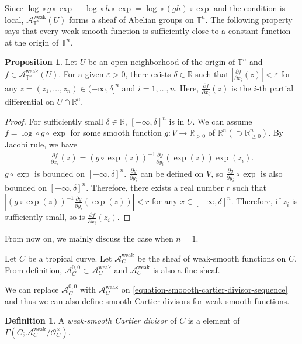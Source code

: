 \documentclass[a4paper,dvipdfmx,reqno,12pt]{amsart}
\theoremstyle{definition}
\newtheorem{definition}[theorem]{Definition}
\newtheorem{proposition}[theorem]{Proposition}
\newcommand{\vep}{\varepsilon}%
\newcommand{\opn}[1]{\operatorname{#1}}
\numberwithin{equation}{section}
\begin{document}
Since $\opn{log}\circ g\circ\opn{exp}+\opn{log}\circ h
\circ \opn{exp}=\opn{log}\circ(gh)\circ\opn{exp}$ and 
the condition is local, 
$\mathcal{A}_{\mathbb{T}^{n}}^{\opn{weak}}(U)$ forms a 
sheaf of Abelian groups on $\mathbb{T}^{n}$. 
The following property says that every weak-smooth 
function is sufficiently close to a constant function 
at the origin of $\mathbb{T}^{n}$.
\begin{proposition}
Let $U$ be an open neighborhood of the origin of 
$\mathbb{T}^{n}$ and 
 $f\in \mathcal{A}_{\mathbb{T}^{n}}^{\mathrm{weak}}(U)$.
For a given $\vep >0$, there exists $\delta\in \mathbb{R}$
such that $|\frac{\partial f}{\partial x_i}(z)|<\vep$
for any $z=(z_1,\ldots,z_n) \in (-\infty,\delta]^{n}$ and $i=1,\ldots,n$. 
Here, $\frac{\partial f}{\partial x_i}(z)$ is the $i$-th partial 
differential on $U\cap \mathbb{R}^{n}$.
\end{proposition}
\begin{proof}
For sufficiently small $\delta\in \mathbb{R}$, 
$[-\infty,\delta]^{n}$ is in $U$. 
We can assume $f=\opn{log}\circ g\circ \opn{exp}$ for
some smooth function 
$g\colon V\to \mathbb{R}_{>0}$ of $\mathbb{R}^{n} 
(\supset \mathbb{R}_{\geq 0}^{n})$.
By Jacobi rule, we have
\begin{align}
\frac{\partial f}{\partial x_i}(z)=(g\circ \opn{exp}(z))^{-1} 
\frac{\partial g}{\partial y_i}(\opn{exp}(z))\opn{exp}(z_i).
\end{align}
$g\circ \opn{exp}$ is bounded on $[-\infty,\delta]^{n}$.
$\frac{\partial g}{\partial y_i}$ can be defined 
on $V$, so $\frac{\partial g}{\partial y_i}\circ \opn{exp}$
is also bounded on $[-\infty,\delta]^{n}$.
Therefore, there exists a real number $r$ such that
$|(g\circ \opn{exp}(z))^{-1} 
\frac{\partial g}{\partial y_i}(\opn{exp}(z))|<r$ for any 
$x\in [-\infty,\delta]^{n}$.
Therefore, if $z_i$ is sufficiently small, so is 
$\frac{\partial f}{\partial x_i}(z_i)$. 
\end{proof}
From now on, we mainly discuss the case when $n=1$.

Let $C$ be a tropical curve. 
Let $\mathcal{A}_C^{\opn{weak}}$ be the sheaf 
of weak-smooth functions on $C$. From definition,
$\mathcal{A}_C^{0,0}\subset \mathcal{A}_C^{\opn{weak}}$
and $\mathcal{A}_C^{\opn{weak}}$ is also a fine sheaf.

We can replace $\mathcal{A}_C^{0,0}$ with 
$\mathcal{A}_C^{\opn{weak}}$
on \cref{equation-smoooth-cartier-divisor-sequence}
and thus we can also define smooth Cartier divisors
for weak-smooth functions. 
\begin{definition}
A \emph{weak-smooth Cartier divisor} of $C$ is a 
element of $\Gamma(C;\mathcal{A}_C^{\opn{weak}}/
\mathcal{O}^{\times}_C)$.
\end{definition}
\end{document}
